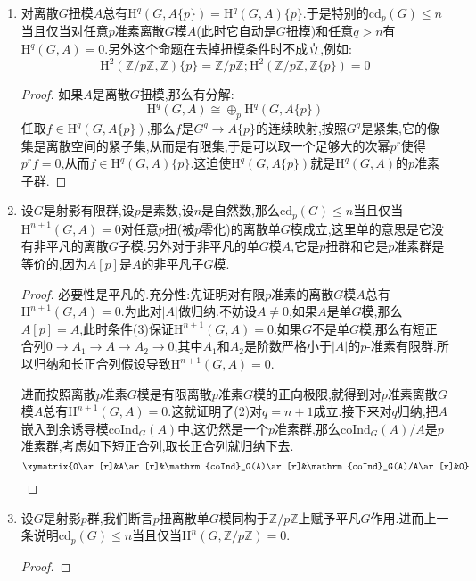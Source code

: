 \begin{enumerate}
	\item 对离散$G$扭模$A$总有$\mathrm{H}^q(G,A\{p\})=\mathrm{H}^q(G,A)\{p\}$.于是特别的$\mathrm{cd}_p(G)\le n$当且仅当对任意$p$准素离散$G$模$A$(此时它自动是$G$扭模)和任意$q>n$有$\mathrm{H}^q(G,A)=0$.另外这个命题在去掉扭模条件时不成立,例如:
	$$\mathrm{H}^2(\mathbb{Z}/p\mathbb{Z},\mathbb{Z})\{p\}=\mathbb{Z}/p\mathbb{Z};\mathrm{H}^2(\mathbb{Z}/p\mathbb{Z},\mathbb{Z}\{p\})=0$$
	\begin{proof}
		
		如果$A$是离散$G$扭模,那么有分解:
		$$\mathrm{H}^q(G,A)\cong\oplus_p\mathrm{H}^q(G,A\{p\})$$
		任取$f\in\mathrm{H}^q(G,A\{p\})$,那么$f$是$G^q\to A\{p\}$的连续映射,按照$G^q$是紧集,它的像集是离散空间的紧子集,从而是有限集,于是可以取一个足够大的次幂$p^r$使得$p^rf=0$,从而$f\in\mathrm{H}^q(G,A)\{p\}$.这迫使$\mathrm{H}^q(G,A\{p\})$就是$\mathrm{H}^q(G,A)$的$p$准素子群.
	\end{proof}
	\item 设$G$是射影有限群,设$p$是素数,设$n$是自然数,那么$\mathrm{cd}_p(G)\le n$当且仅当$\mathrm{H}^{n+1}(G,A)=0$对任意$p$扭(被$p$零化)的离散单$G$模成立,这里单的意思是它没有非平凡的离散$G$子模.另外对于非平凡的单$G$模$A$,它是$p$扭群和它是$p$准素群是等价的,因为$A[p]$是$A$的非平凡子$G$模.
	\begin{proof}
		
		必要性是平凡的.充分性:先证明对有限$p$准素的离散$G$模$A$总有$\mathrm{H}^{n+1}(G,A)=0$.为此对$|A|$做归纳.不妨设$A\not=0$,如果$A$是单$G$模,那么$A[p]=A$,此时条件(3)保证$\mathrm{H}^{n+1}(G,A)=0$.如果$G$不是单$G$模,那么有短正合列$0\to A_1\to A\to A_2\to0$,其中$A_1$和$A_2$是阶数严格小于$|A|$的$p$-准素有限群.所以归纳和长正合列假设导致$\mathrm{H}^{n+1}(G,A)=0$.
		
		\qquad
		
		进而按照离散$p$准素$G$模是有限离散$p$准素$G$模的正向极限,就得到对$p$准素离散$G$模$A$总有$\mathrm{H}^{n+1}(G,A)=0$.这就证明了(2)对$q=n+1$成立.接下来对$q$归纳,把$A$嵌入到余诱导模$\mathrm{coInd}_G(A)$中,这仍然是一个$p$准素群,那么$\mathrm{coInd}_G(A)/A$是$p$准素群,考虑如下短正合列,取长正合列就归纳下去.
		$$\xymatrix{0\ar[r]&A\ar[r]&\mathrm{coInd}_G(A)\ar[r]&\mathrm{coInd}_G(A)/A\ar[r]&0}$$
	\end{proof}
	\item 设$G$是射影$p$群,我们断言$p$扭离散单$G$模同构于$\mathbb{Z}/p\mathbb{Z}$上赋予平凡$G$作用.进而上一条说明$\mathrm{cd}_p(G)\le n$当且仅当$\mathrm{H}^n(G,\mathbb{Z}/p\mathbb{Z})=0$.
	\begin{proof}
		

\end{proof}
\end{enumerate}
